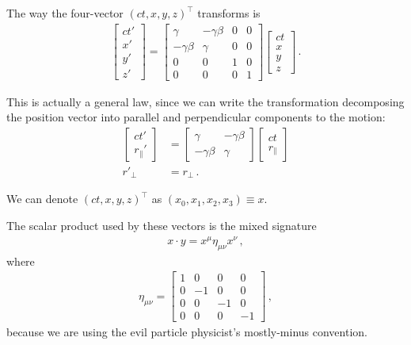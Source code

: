 \documentclass[main.tex]{subfiles}
\begin{document}
The way the four-vector \((ct, x, y, z)^{\top}\) transforms is 
%
\begin{align}
\left[\begin{array}{c}
ct' \\ 
x' \\ 
y' \\ 
z'
\end{array}\right]
= \left[\begin{array}{cccc}
\gamma  & -\gamma \beta  & 0 & 0 \\ 
-\gamma \beta  & \gamma  & 0 & 0 \\ 
0 & 0 & 1 & 0 \\ 
0 & 0 & 0 & 1
\end{array}\right]
\left[\begin{array}{c}
ct \\ 
x \\ 
y \\ 
z
\end{array}\right]
\,.
\end{align}

This is actually a general law, since we can write the transformation decomposing the position vector into parallel and perpendicular components to the motion: 
%
\begin{align}
\left[\begin{array}{c}
ct' \\ 
r_{\parallel}'
\end{array}\right]
&=
\left[\begin{array}{cc}
\gamma  & -\gamma \beta  \\ 
-\gamma \beta  & \gamma 
\end{array}\right]
\left[\begin{array}{c}
ct \\ 
r_{\parallel}
\end{array}\right]  \\
r'_{\perp} &= r_{\perp}
\,.
\end{align}

We can denote \((ct, x, y, z)^{\top}\) as \((x_0, x_1, x_2, x_3 ) \equiv x\). 

The scalar product used by these vectors is the mixed signature 
%
\begin{align}
x \cdot y = x^{\mu } \eta_{\mu \nu } x^{\nu }
\,,
\end{align}
%
where
%
\begin{align}
\eta_{\mu \nu } = \left[\begin{array}{cccc}
1 & 0 & 0 & 0 \\ 
0 & -1 & 0 & 0 \\ 
0 & 0 & -1 & 0 \\ 
0 & 0 & 0 & -1
\end{array}\right]
\,,
\end{align}
%
because we are using the evil particle physicist's mostly-minus convention.
\end{document}

